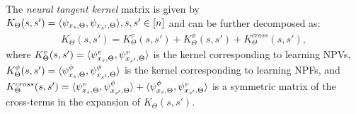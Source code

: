 The \emph{neural tangent kernel} matrix is given by $K_{\Theta}(s,s')=\langle \psi_{x_s,\Theta},\psi_{x_{s'},\Theta}\rangle, s, s'\in[n]$ and can be further decomposed as:
\begin{align}\label{eq:kerneldecomp}
K_{\Theta}(s,s')=K^v_{\Theta}(s,s')+K^{\phi}_{\Theta}(s,s')+K^{cross}_{\Theta}(s,s'),
\end{align}
where $K^v_{\Theta}(s,s')=\langle \psi^v_{x_s,\Theta},\psi^v_{x_{s'},\Theta}\rangle$ is the kernel corresponding to learning NPVs, $K^{\phi}_{\Theta}(s,s')=\langle \psi^{\phi}_{x_s,\Theta},\psi^{\phi}_{x_{s'},\Theta}\rangle$ is the kernel corresponding to learning NPFs, and $K^{cross}_{\Theta}(s,s')=\langle \psi^v_{x_s,\Theta},\psi^{\phi}_{x_{s'},\Theta}\rangle+\langle \psi^{\phi}_{x_s,\Theta},\psi^{v}_{x_{s'},\Theta}\rangle$ is a symmetric matrix of the cross-terms in the expansion of $K_{\Theta}(s,s')$.

